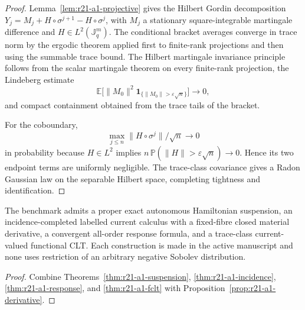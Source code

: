 \begin{proof}
Lemma~\ref{lem:r21-a1-projective} gives the Hilbert Gordin decomposition
$Y_j=M_j+H\circ\sigma^{j+1}-H\circ\sigma^j$, with $M_j$ a stationary
square-integrable martingale difference and $H\in L^2(\mathbb J_q^m)$.  The
conditional bracket averages converge in trace norm by the ergodic theorem
applied first to finite-rank projections and then using the summable trace
bound.  The Hilbert martingale invariance principle follows from the scalar
martingale theorem on every finite-rank projection, the Lindeberg estimate
\[
 \mathbb E\bigl[\|M_0\|^2
  \mathbf1_{\{\|M_0\|>\varepsilon\sqrt n\}}\bigr]\longrightarrow0,
\]
and compact containment obtained from the trace tails of the bracket.

For the coboundary,
\[
 \max_{j\le n}\|H\circ\sigma^j\|/\sqrt n\longrightarrow0
\]
in probability because $H\in L^2$ implies
$n\,\mathbb P(\|H\|>\varepsilon\sqrt n)\to0$.  Hence its two endpoint terms
are uniformly negligible.  The trace-class covariance gives a Radon Gaussian
law on the separable Hilbert space, completing tightness and identification.
\end{proof}

\begin{theorem}
\label{thm:r21-a1-main}
The benchmark admits a proper exact autonomous Hamiltonian suspension, an
incidence-completed labelled current calculus with a fixed-fibre closed
material derivative, a convergent all-order response formula, and a
trace-class current-valued functional CLT.  Each construction is made in the
active manuscript and none uses restriction of an arbitrary negative
Sobolev distribution.
\end{theorem}

\begin{proof}
Combine Theorems~\ref{thm:r21-a1-suspension},
\ref{thm:r21-a1-incidence}, \ref{thm:r21-a1-response}, and
\ref{thm:r21-a1-fclt} with
Proposition~\ref{prop:r21-a1-derivative}.
\end{proof}
